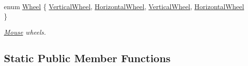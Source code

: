 \begin{DoxyCompactItemize}
enum \hyperlink{classsf_1_1_mouse_a60dd479a43f26f200e7957aa11803ff4}{Wheel} \{ \hyperlink{classsf_1_1_mouse_a60dd479a43f26f200e7957aa11803ff4a8964269d4e4c0efc6cdefaad1b700250}{Vertical\-Wheel}, 
\hyperlink{classsf_1_1_mouse_a60dd479a43f26f200e7957aa11803ff4ab2ce0c19ab64d60255d7671a86d0f021}{Horizontal\-Wheel}, 
\hyperlink{classsf_1_1_mouse_a60dd479a43f26f200e7957aa11803ff4a8964269d4e4c0efc6cdefaad1b700250}{Vertical\-Wheel}, 
\hyperlink{classsf_1_1_mouse_a60dd479a43f26f200e7957aa11803ff4ab2ce0c19ab64d60255d7671a86d0f021}{Horizontal\-Wheel}
 \}
\begin{DoxyCompactList}\small\item\em \hyperlink{classsf_1_1_mouse}{Mouse} wheels. \end{DoxyCompactList}\end{DoxyCompactItemize}
\subsection*{Static Public Member Functions}
